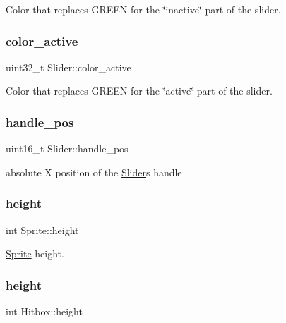 Color that replaces G\+R\+E\+EN for the \char`\"{}inactive\char`\"{} part of the slider. 

\mbox{\label{group__sprite_ga30afc9a607e8770d283f7219d837bfc2}} 
\subsubsection{\texorpdfstring{color\+\_\+active}{color\_active}}
{\footnotesize\ttfamily uint32\+\_\+t Slider\+::color\+\_\+active}



Color that replaces G\+R\+E\+EN for the \char`\"{}active\char`\"{} part of the slider. 

\mbox{\label{group__sprite_gac1256085ee6a3241fb177a28befc0eef}} 
\subsubsection{\texorpdfstring{handle\+\_\+pos}{handle\_pos}}
{\footnotesize\ttfamily uint16\+\_\+t Slider\+::handle\+\_\+pos}



absolute X position of the \mbox{\hyperlink{struct_slider}{Slider}}\textquotesingle{}s handle 

\mbox{\label{group__sprite_ga1f07c8f2080c193759aec0e13503d7ab}} 
\subsubsection{\texorpdfstring{height}{height}\hspace{0.1cm}{\footnotesize\ttfamily [1/3]}}
{\footnotesize\ttfamily int Sprite\+::height}



\mbox{\hyperlink{struct_sprite}{Sprite}} height. 

\mbox{\label{group__sprite_ga4510d5b903afe522c6b1e964016d988c}} 
\subsubsection{\texorpdfstring{height}{height}\hspace{0.1cm}{\footnotesize\ttfamily [2/3]}}
{\footnotesize\ttfamily int Hitbox\+::height}




